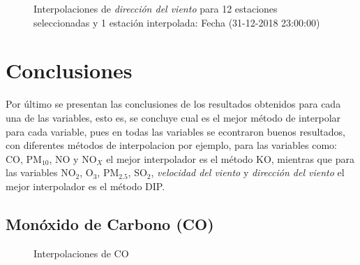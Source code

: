 \begin{figure}[H]
\centering
{}
\subfigure[KO] {\texttt{[image: ./ok\_12\_9\_26302]}}
\subfigure[KU] {\texttt{[image: ./uk\_12\_9\_26302]}}
\caption{Interpolaciones de  {\em dirección del viento} para 12 estaciones seleccionadas y 1 estación interpolada: Fecha (31-12-2018 23:00:00)}
\label{velocityfigure4}
\end{figure}




\section{Conclusiones}

Por último se presentan las conclusiones de los resultados obtenidos para cada una de las variables, esto es, se concluye cual es el mejor método de interpolar para cada variable, pues en todas las variables se econtraron buenos resultados, con diferentes métodos de interpolacion por ejemplo, para las variables como: CO, PM$_{10}$, NO y NO$_{X}$ el mejor interpolador es el método KO, mientras que para las variables NO$_{2}$, O$_{3}$, PM$_{2.5}$, SO$_{2}$, {\em velocidad del viento} y {\em dirección del viento} el mejor interpolador es el método DIP.
 
\subsection{Monóxido de Carbono (CO)}
\begin{figure}[h]
\centering
{}
\caption{Interpolaciones de CO }
\label{final_0}
\end{figure}

